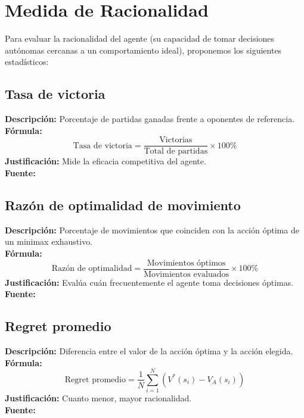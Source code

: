 \documentclass[conference]{IEEEtran}
\begin{document}
\section{Medida de Racionalidad}

Para evaluar la racionalidad del agente (su capacidad de tomar decisiones autónomas cercanas a un comportamiento ideal), proponemos los siguientes estadísticos:

\subsection{Tasa de victoria}

\textbf{Descripción:} Porcentaje de partidas ganadas frente a oponentes de referencia. \\
\textbf{Fórmula:}
\begin{equation}
	\text{Tasa de victoria} = \frac{\text{Victorias}}{\text{Total de partidas}} \times 100\%
\end{equation}
\textbf{Justificación:} Mide la eficacia competitiva del agente. \\
\textbf{Fuente:} \cite{herik2002games}

\subsection{Razón de optimalidad de movimiento}

\textbf{Descripción:} Porcentaje de movimientos que coinciden con la acción óptima de un minimax exhaustivo. \\
\textbf{Fórmula:}
\begin{equation}
	\text{Razón de optimalidad} = \frac{\text{Movimientos óptimos}}{\text{Movimientos evaluados}} \times 100\%
\end{equation}
\textbf{Justificación:} Evalúa cuán frecuentemente el agente toma decisiones óptimas. \\
\textbf{Fuente:} \cite{schaeffer1997chinook}

\subsection{Regret promedio}

\textbf{Descripción:} Diferencia entre el valor de la acción óptima y la acción elegida. \\
\textbf{Fórmula:}
\begin{equation}
	\text{Regret promedio} = \frac{1}{N} \sum_{i=1}^{N} \left(V^*(s_i) - V_A(s_i)\right)
\end{equation}
\textbf{Justificación:} Cuanto menor, mayor racionalidad. \\
\textbf{Fuente:} \cite{savage1954foundations}
\end{document}
